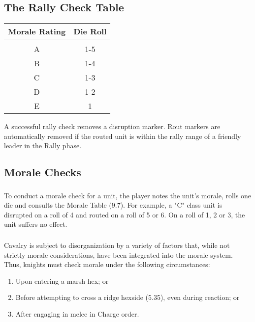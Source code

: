 \subsection{The Rally Check Table}

\begin{center}
\begin{tabular}{ cc }
    \textbf{Morale Rating} & {\textbf{Die Roll}} \\
    \hline \\ [-2.0ex]
    A & 1-5 \\
    B & 1-4 \\
    C & 1-3 \\
    D & 1-2 \\
    E & 1 \\
    \hline
\end{tabular}
\end{center}
A successful rally check removes a disruption marker. Rout markers are automatically removed if the routed unit is within the rally range of a friendly leader in the Rally phase.

\subsection{Morale Checks}

\subsubsection[Conducting Morale Checks]{} To conduct a morale check for a unit, the player notes the unit's morale, rolls one die and consults the Morale Table (9.7). For example, a "C" class unit is disrupted on a roll of 4 and routed on a roll of 5 or 6. On a roll of 1, 2 or 3, the unit suffers no effect.

\subsubsection[Cavalry]{} Cavalry is subject to disorganization by a variety of factors that, while not strictly morale considerations, have been integrated into the morale system. Thus, knights must check morale under the following circumstances:

\begin{enumerate}
  \item Upon entering a marsh hex; or
  \item Before attempting to cross a ridge hexside (5.35), even during reaction; or
  \item After engaging in melee in Charge order.
\end{enumerate}

